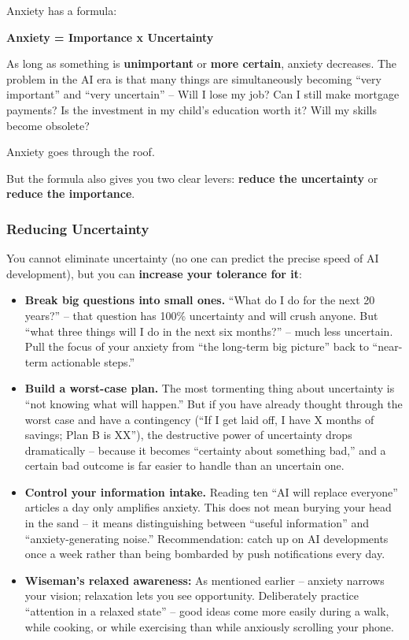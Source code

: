 Anxiety has a formula:

\textbf{Anxiety = Importance x Uncertainty}

As long as something is \textbf{unimportant} or \textbf{more certain},
anxiety decreases. The problem in the AI era is that many things are
simultaneously becoming ``very important'' and ``very uncertain'' --
Will I lose my job? Can I still make mortgage payments? Is the
investment in my child's education worth it? Will my skills become
obsolete?

Anxiety goes through the roof.

But the formula also gives you two clear levers: \textbf{reduce the
uncertainty} or \textbf{reduce the importance}.

\subsubsection{Reducing Uncertainty}\label{reducing-uncertainty}

You cannot eliminate uncertainty (no one can predict the precise speed
of AI development), but you can \textbf{increase your tolerance for it}:

\begin{itemize}
\tightlist
\item
  \textbf{Break big questions into small ones.} ``What do I do for the
  next 20 years?'' -- that question has 100\% uncertainty and will crush
  anyone. But ``what three things will I do in the next six months?'' --
  much less uncertain. Pull the focus of your anxiety from ``the
  long-term big picture'' back to ``near-term actionable steps.''
\item
  \textbf{Build a worst-case plan.} The most tormenting thing about
  uncertainty is ``not knowing what will happen.'' But if you have
  already thought through the worst case and have a contingency (``If I
  get laid off, I have X months of savings; Plan B is XX''), the
  destructive power of uncertainty drops dramatically -- because it
  becomes ``certainty about something bad,'' and a certain bad outcome
  is far easier to handle than an uncertain one.
\item
  \textbf{Control your information intake.} Reading ten ``AI will
  replace everyone'' articles a day only amplifies anxiety. This does
  not mean burying your head in the sand -- it means distinguishing
  between ``useful information'' and ``anxiety-generating noise.''
  Recommendation: catch up on AI developments once a week rather than
  being bombarded by push notifications every day.
\item
  \textbf{Wiseman's relaxed awareness:} As mentioned earlier -- anxiety
  narrows your vision; relaxation lets you see opportunity. Deliberately
  practice ``attention in a relaxed state'' -- good ideas come more
  easily during a walk, while cooking, or while exercising than while
  anxiously scrolling your phone.
\end{itemize}

